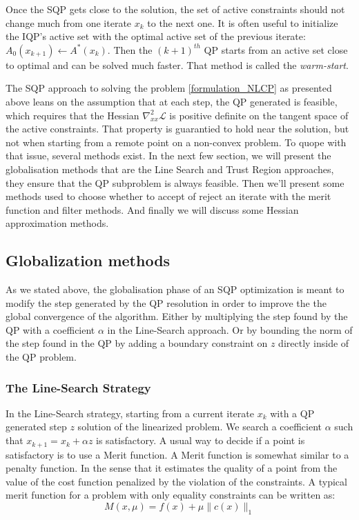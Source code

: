 Once the SQP gets close to the solution, the set of active constraints should not change much from one iterate $x_k$ to the next one.
It is often useful to initialize the IQP's active set with the optimal active set of the previous iterate: $\mathit{A}_0(x_{k+1})\leftarrow\mathit{A}^*(x_k)$. Then the ${(k+1)}^{th}$ QP starts from an active set close to optimal and can be solved much faster.
That method is called the \textit{warm-start}.

The SQP approach to solving the problem \ref{formulation_NLCP} as presented above leans on the assumption that at each step, the QP generated is feasible,
which requires that the Hessian $\nabla_{xx}^2\mathcal{L}$ is positive definite on the tangent space of the active constraints.
That property is guarantied to hold near the solution, but not when starting from a remote point on a non-convex problem.
To quope with that issue, several methods exist.
In the next few section, we will present the globalisation methods that are the Line Search and Trust Region approaches, they ensure that the QP subproblem is always feasible.
Then we'll present some methods used to choose whether to accept of reject an iterate with the merit function and filter methods.
And finally we will discuss some Hessian approximation methods.

\subsection{Globalization methods}
\label{sub:globalization_methods}

As we stated above, the globalisation phase of an SQP optimization is meant to modify the step generated by the QP resolution in order to improve the the global convergence of the algorithm.
Either by multiplying the step found by the QP with a coefficient $\alpha$ in the Line-Search approach.
Or by bounding the norm of the step found in the QP by adding a boundary constraint on $z$ directly inside of the QP problem.

\subsubsection{The Line-Search Strategy}
In the Line-Search strategy, starting from a current iterate $x_k$ with a QP generated step $z$ solution of the linearized problem. We search a coefficient $\alpha$ such that $x_{k+1}=x_k+\alpha z$ is satisfactory.
A usual way to decide if a point is satisfactory is to use a Merit function.
A Merit function is somewhat similar to a penalty function.
In the sense that it estimates the quality of a point from the value of the cost function penalized by the violation of the constraints.
A typical merit function for a problem with only equality constraints can be written as:
\begin{equation}
  M(x,\mu) = f(x)+\mu \|c(x)\|_1
\end{equation}

